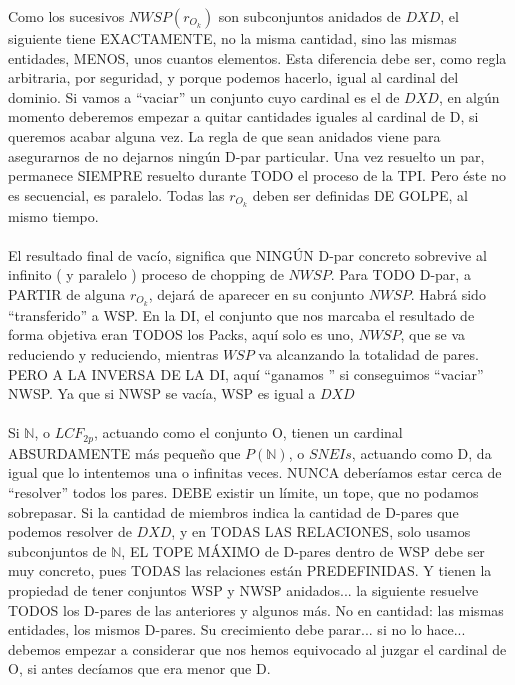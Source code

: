	\noindent
	Como los sucesivos $NWSP(r_{O_{k}})$ son subconjuntos anidados de $DXD$, el siguiente tiene EXACTAMENTE, no la misma cantidad, sino las mismas entidades, MENOS, unos cuantos elementos. Esta diferencia debe ser, como regla arbitraria, por seguridad, y porque podemos hacerlo, igual al cardinal del dominio. Si vamos a ``vaciar'' un conjunto cuyo cardinal es el de $DXD$, en algún momento deberemos empezar a quitar cantidades iguales al cardinal de D, si queremos acabar alguna vez. La regla de que sean anidados viene para asegurarnos de no dejarnos ningún D-par particular. Una vez resuelto un par, permanece SIEMPRE resuelto durante TODO el proceso de la TPI. Pero éste no es secuencial, es paralelo. Todas las $r_{O_{k}}$ deben ser definidas DE GOLPE, al mismo tiempo.
	\\\\
	
	\noindent
	El resultado final de vacío, significa que NINGÚN D-par concreto sobrevive al infinito ( y paralelo ) proceso de chopping de $NWSP$. Para TODO D-par, a PARTIR de alguna $r_{O_{k}}$, dejará de aparecer en su conjunto $NWSP$. Habrá sido ``transferido'' a WSP. En la DI, el conjunto que nos marcaba el resultado de forma objetiva eran TODOS los Packs, aquí solo es uno, $NWSP$, que se va reduciendo y reduciendo, mientras $WSP$ va alcanzando la totalidad de pares. PERO A LA INVERSA DE LA DI, aquí ``ganamos '' si conseguimos ``vaciar'' NWSP. Ya que si NWSP se vacía, WSP es igual a $DXD$
	\\\\
	
	\noindent
	Si $\mathbb{N}$, o $LCF_{2p}$, actuando como el conjunto O, tienen un cardinal ABSURDAMENTE más pequeño que $P(\mathbb{N})$, o $SNEIs$, actuando como D, da igual que lo intentemos una o infinitas veces. NUNCA deberíamos estar cerca de ``resolver'' todos los pares. DEBE existir un límite, un tope, que no podamos sobrepasar. Si la cantidad de miembros indica la cantidad de D-pares que podemos resolver de $DXD$, y en TODAS LAS RELACIONES, solo usamos subconjuntos de $\mathbb{N}$, EL TOPE MÁXIMO de D-pares dentro de WSP debe ser muy concreto, pues TODAS las relaciones están PREDEFINIDAS. Y tienen la propiedad de tener conjuntos WSP y NWSP anidados... la siguiente resuelve TODOS los D-pares de las anteriores y algunos más. No en cantidad: las mismas entidades, los mismos D-pares. Su crecimiento debe parar... si no lo hace... debemos empezar a considerar que nos hemos equivocado al juzgar el cardinal de O, si antes decíamos que era menor que D.
	\\\\
	
